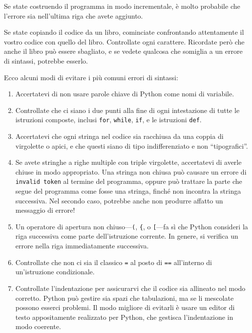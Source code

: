 \documentclass[10pt]{book}
\begin{document}
Se state costruendo il programma in modo incrementale, è molto probabile che l'errore sia nell'ultima riga che avete aggiunto.

Se state copiando il codice da un libro, cominciate confrontando attentamente il vostro codice con quello del libro. Controllate ogni carattere. Ricordate però che anche il libro può essere sbagliato, e se vedete qualcosa che somiglia a un errore di sintassi, potrebbe esserlo.

Ecco alcuni modi di evitare i più comuni errori di sintassi:

\begin{enumerate}

\item Accertatevi di non usare parole chiave di Python come nomi di variabile.

\item Controllate che ci siano i due punti alla fine di ogni intestazione di tutte le istruzioni composte, inclusi {\tt for}, {\tt while},
{\tt if}, e le istruzioni {\tt def}.

\item Accertatevi che ogni stringa nel codice sia racchiusa da una coppia di virgolette o apici, e che questi siano di tipo indifferenziato e non ``tipografici''.

\item Se avete stringhe a righe multiple con triple virgolette, accertatevi di averle chiuse in modo appropriato. Una stringa non chiusa può causare un errore di {\tt invalid token} al termine del programma, oppure può trattare la parte che segue del programma come fosse una stringa, finché non incontra la stringa successiva. Nel secondo caso, potrebbe anche non produrre affatto un messaggio di errore!

\item Un operatore di apertura non chiuso---\verb+(+, \verb+{+, o
  \verb+[+---fa sì che Python consideri la riga successiva come parte dell'istruzione corrente. In genere, si verifica un errore nella riga immediatamente successiva.

\item Controllate che non ci sia il classico {\tt =} al posto di {\tt ==} all'interno di un'istruzione condizionale.

\item Controllate l'indentazione per assicurarvi che il codice sia allineato nel modo corretto. Python può gestire sia spazi che tabulazioni, ma se li mescolate possono esserci problemi. Il modo migliore di evitarli è usare un editor di testo appositamente realizzato per Python, che gestisca l'indentazione in modo coerente.


\end{enumerate}
\end{document}
